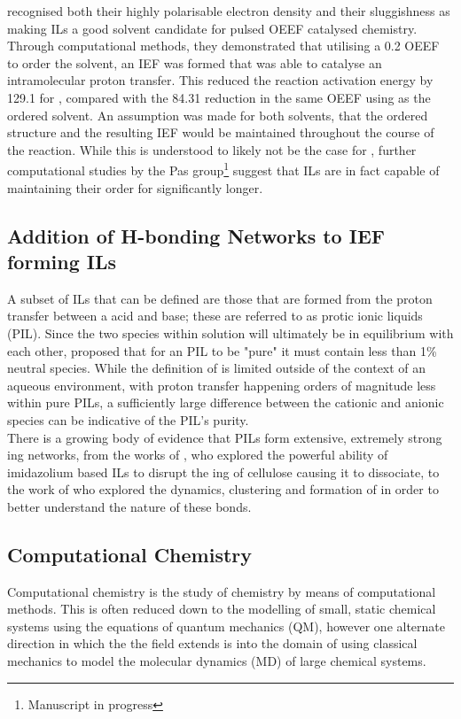 recognised both their highly polarisable electron density and their sluggishness as making ILs a good solvent candidate for pulsed OEEF catalysed chemistry. Through computational methods, they demonstrated that utilising a \SI{0.2}{\va} OEEF to order the solvent, an IEF was formed that was able to catalyse an intramolecular proton transfer. This reduced the reaction activation energy by \SI{129.1}{\kjmol} for , compared with the \SI{84.31}{\kjmol} reduction in the same OEEF using  as the ordered solvent. An assumption was made for both solvents, that the ordered structure and the resulting IEF would be maintained throughout the course of the reaction. While this is understood to likely not be the case for , further computational studies by the Pas group\footnote{Manuscript in progress} suggest that ILs are in fact capable of maintaining their order for significantly longer.

\subsection{Addition of H-bonding Networks to IEF forming ILs}
A subset of ILs that can be defined are those that are formed from the proton transfer between a \bronsted acid and \bronsted base; these are referred to as protic ionic liquids (PIL)\cite{Greaves2008}. Since the two species within solution will ultimately be in equilibrium with each other,  proposed that for an PIL to be "pure" it must contain less than 1\% neutral species. While the definition of \pka is limited outside of the context of an aqueous environment, with proton transfer happening orders of magnitude less within pure PILs, \cite{MacFarlane2007} a sufficiently large \pka difference between the cationic and anionic species can be indicative of the PIL's purity\cite{Yoshizawa2003}.\\

There is a growing body of evidence that PILs form extensive, extremely strong {\hb}ing networks, from the works of , who explored the powerful ability of imidazolium based ILs to disrupt the {\hb}ing of cellulose causing it to dissociate, to the work of \citeauthor{Brehm2013}\cite{Brehm2013,Brehm2012} who explored the dynamics, clustering and formation of  in order to better understand the nature of these bonds.\\

\subsection{Computational Chemistry}
Computational chemistry is the study of chemistry by means of computational methods. This is often reduced down to the modelling of small, static chemical systems using the equations of quantum mechanics (QM), however one alternate direction in which the the field extends is into the domain of using classical mechanics to model the molecular dynamics (MD) of large chemical systems.\\

